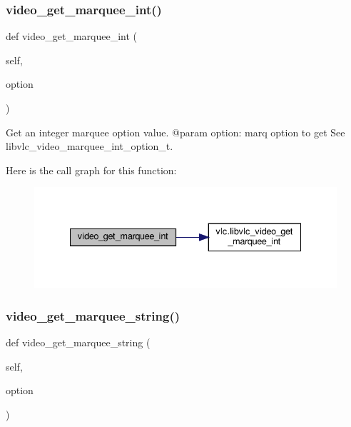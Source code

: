 \subsubsection{\texorpdfstring{video\+\_\+get\+\_\+marquee\+\_\+int()}{video\_get\_marquee\_int()}}
{\footnotesize\ttfamily def video\+\_\+get\+\_\+marquee\+\_\+int (\begin{DoxyParamCaption}\item[{}]{self,  }\item[{}]{option }\end{DoxyParamCaption})}

\begin{DoxyVerb}Get an integer marquee option value.
@param option: marq option to get See libvlc_video_marquee_int_option_t.
\end{DoxyVerb}
 Here is the call graph for this function\+:
\nopagebreak
\begin{figure}[H]
\begin{center}
\leavevmode
\includegraphics[width=335pt]{classvlc_1_1_media_player_a3b08a7d4454fa62d9c4bb75351b04f71_cgraph}
\end{center}
\end{figure}
\mbox{\label{classvlc_1_1_media_player_adbbb7771337a1484af090fa488d0a360}} 
\subsubsection{\texorpdfstring{video\+\_\+get\+\_\+marquee\+\_\+string()}{video\_get\_marquee\_string()}}
{\footnotesize\ttfamily def video\+\_\+get\+\_\+marquee\+\_\+string (\begin{DoxyParamCaption}\item[{}]{self,  }\item[{}]{option }\end{DoxyParamCaption})}

